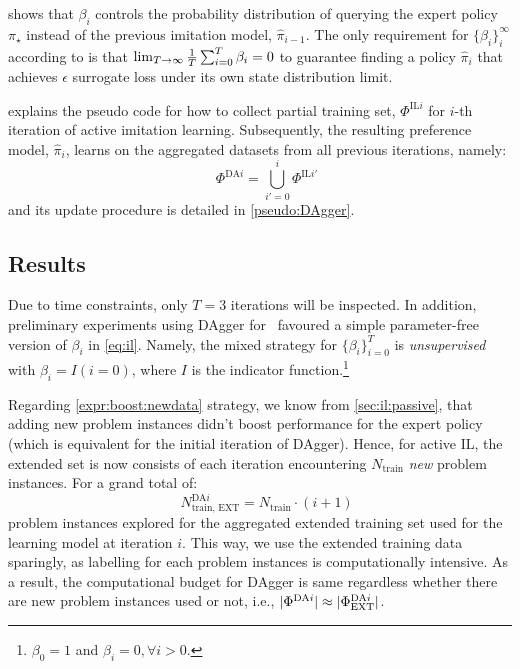 \documentclass[twocolumn]{svjour3}
\begin{document}
 shows that $\beta_i$ controls the probability distribution of 
querying the expert policy $\pi_\star$ instead of the previous imitation model, 
$\hat{\pi}_{i-1}$.  
The only requirement for $\{\beta_i\}_i^\infty$ according to \cite{RossGB11} is 
that $\limit{\frac{1}{T}\sum_{i=0}^T\beta_i}{T\to\infty}{0}$ to guarantee 
finding a policy $\hat{\pi}_i$ that achieves $\epsilon$ surrogate loss under 
its own state distribution limit.

 explains the pseudo code for how to collect 
partial training set, $\Phi^{\text{IL}i}$ for $i$-th iteration of active 
imitation learning.
Subsequently, the resulting preference model, $\hat{\pi}_i$, learns on the 
aggregated datasets from all previous iterations, namely:
\begin{equation}\quad\label{eq:DAgger}
\Phi^{\text{DA}i}=\bigcup_{i'=0}^{i}\Phi^{\text{IL}i'}
\end{equation}
and its update procedure is detailed in \cref{pseudo:DAgger}.




\subsection{Results}\label{sec:ail:expr}
Due to time constraints, only $T=3$ iterations will be inspected.
In addition, preliminary experiments using DAgger  for \JSP\ favoured a 
simple parameter-free version of $\beta_i$ in \cref{eq:il}. 
Namely, the mixed strategy for $\{\beta_i\}_{i=0}^T$ is \emph{unsupervised} 
with $\beta_i=I(i=0)$, where $I$ is the indicator 
function.\footnote{$\beta_0=1$ and $\beta_i=0,\forall i>0$.}

Regarding \ref{expr:boost:newdata} strategy, we know from 
\cref{sec:il:passive}, that adding new problem instances didn't boost 
performance for the expert policy (which is equivalent for the initial 
iteration of DAgger). 
Hence, for active IL, the extended set is now consists of each iteration 
encountering $N_{\text{train}}$ \emph{new} problem instances. For a grand total 
of: 
\begin{equation}\quad
N^{\text{DA}i}_{\text{train, EXT}}=N_{\text{train}}\cdot (i+1) 
\end{equation}
problem instances explored for the aggregated extended training set used for 
the learning model at iteration $i$.
This way, we use the extended training data sparingly, as labelling for each 
problem instances is computationally intensive. As a result, the computational 
budget for DAgger is same regardless whether there are new problem instances 
used or not, i.e., 
$\abs{\Phi^{\text{DA}i}}\approx\abs{\Phi^{\text{DA}i}_{\text{EXT}}}$.
\end{document}
